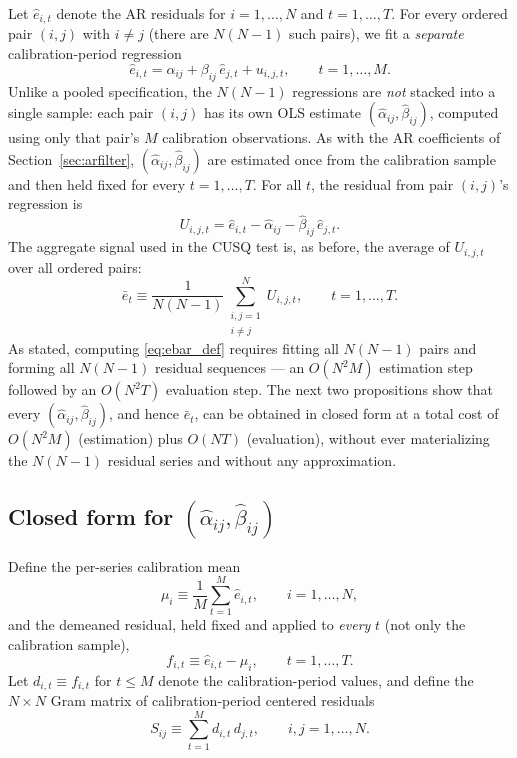 \documentclass[12pt]{article}
\begin{document}
Let $\hat e_{i,t}$ denote the AR residuals for $i=1,\dots,N$ and
$t=1,\dots,T$. For every ordered pair $(i,j)$ with $i\ne j$ (there are
$N(N-1)$ such pairs), we fit a \emph{separate} calibration-period
regression
\begin{equation}
\hat e_{i,t} = \alpha_{ij} + \beta_{ij}\,\hat e_{j,t} + u_{i,j,t},
\qquad t=1,\dots,M.
\label{eq:pairreg}
\end{equation}
Unlike a pooled specification, the $N(N-1)$ regressions are \emph{not}
stacked into a single sample: each pair $(i,j)$ has its own OLS estimate
$(\hat\alpha_{ij},\hat\beta_{ij})$, computed using only that pair's $M$
calibration observations. As with the AR coefficients of
Section~\ref{sec:arfilter}, $(\hat\alpha_{ij},\hat\beta_{ij})$ are estimated
once from the calibration sample and then held fixed for every
$t=1,\dots,T$. For all $t$, the residual from pair $(i,j)$'s regression is
\begin{equation}
U_{i,j,t} = \hat e_{i,t} - \hat\alpha_{ij} - \hat\beta_{ij}\,\hat e_{j,t}.
\label{eq:Uijt}
\end{equation}
The aggregate signal used in the CUSQ test is, as before, the average of
$U_{i,j,t}$ over all ordered pairs:
\begin{equation}
\bar e_t \equiv
\frac{1}{N(N-1)}\sum_{\substack{i,j=1\\i\ne j}}^{N} U_{i,j,t},
\qquad t=1,\dots,T.
\label{eq:ebar_def}
\end{equation}
As stated, computing \eqref{eq:ebar_def} requires fitting all $N(N-1)$
pairs and forming all $N(N-1)$ residual sequences --- an $O(N^2M)$
estimation step followed by an $O(N^2T)$ evaluation step. The next two
propositions show that every $(\hat\alpha_{ij},\hat\beta_{ij})$, and hence
$\bar e_t$, can be obtained in closed form at a total cost of $O(N^2M)$
(estimation) plus $O(NT)$ (evaluation), without ever materializing the
$N(N-1)$ residual series and without any approximation.

\subsection{Closed form for $(\hat\alpha_{ij},\hat\beta_{ij})$}

Define the per-series calibration mean
\begin{equation}
\mu_i \equiv \frac{1}{M}\sum_{t=1}^{M}\hat e_{i,t}, \qquad i=1,\dots,N,
\label{eq:mu}
\end{equation}
and the demeaned residual, held fixed and applied to \emph{every} $t$ (not
only the calibration sample),
\begin{equation}
f_{i,t} \equiv \hat e_{i,t} - \mu_i, \qquad t=1,\dots,T.
\label{eq:fit}
\end{equation}
Let $d_{i,t} \equiv f_{i,t}$ for $t \le M$ denote the calibration-period
values, and define the $N\times N$ Gram matrix of calibration-period
centered residuals
\begin{equation}
S_{ij} \equiv \sum_{t=1}^{M} d_{i,t}\,d_{j,t}, \qquad i,j=1,\dots,N.
\label{eq:Sij}
\end{equation}
\end{document}
